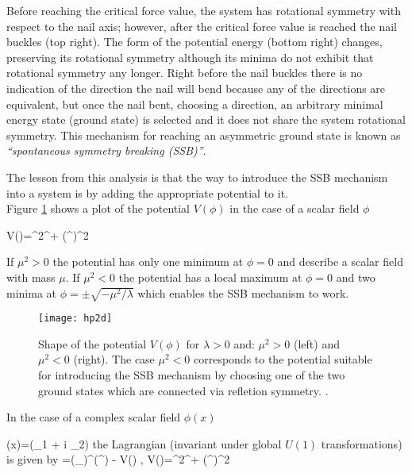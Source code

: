 \noindent Before reaching the critical force value, the system has rotational symmetry with respect to the nail axis; however, after the critical force value is reached the nail buckles (top right). The form of the potential energy (bottom right) changes, preserving its rotational symmetry although its minima do not exhibit that rotational symmetry any longer. Right before the nail buckles there is no indication of the direction the nail will bend because any of the directions are equivalent, but once the nail bent, choosing a direction, an arbitrary minimal energy state (ground state) is selected and it does not share the system rotational symmetry. This mechanism for reaching an asymmetric ground state is known as \textit{``spontaneous symmetry breaking (SSB)''}.       

\noindent The lesson from this analysis is that the way to introduce the SSB mechanism into a system is by adding the appropriate potential to it.\\ 

\noindent Figure \ref{hp2d} shows a plot of the potential $V(\phi)$ in the case of a scalar field $\phi$

\beqn\label{Higgs_potential}
V(\phi)=\mu^2\phi^\dagger\phi + \lambda(\phi^\dagger\phi)^2
\eeqn

\noindent If $\mu^2>0$ the potential has only one minimum at $\phi=0$ and describe a scalar field with mass $\mu$. If $\mu^2<0$ the potential has a local maximum at $\phi=0$ and two minima at $\phi=\pm \sqrt{-\mu^2/\lambda}$ which enables the SSB mechanism to work. 

\begin{figure}[!h]
\centering
\texttt{[image: hp2d]}
\caption[SSB Potential form]{Shape of the potential $V(\phi)$ for $\lambda>0$ and: $\mu^2>0$ (left) and $\mu^2<0$ (right). The case $\mu^2<0$ corresponds to the potential suitable for introducing the SSB mechanism by choosing one of the two ground states which are connected via refletion symmetry. \cite{broken_symmetry}.}
\label{hp2d}
\end{figure}

\noindent In the case of a complex scalar field $\phi(x)$

\beqn\label{complex_scalar}
\phi(x)=(\phi_1 + i \phi_2)
\eeqn
\noindent the Lagrangian (invariant under global $U(1)$ transformations) is given by 
\beqn\label{higgs_potential}
\Lagr=(\partial_\mu\phi)^\dagger(\partial^\mu\phi) - V(\phi) , \qquad V(\phi)=\mu^2\phi^\dagger\phi + \lambda(\phi^\dagger\phi)^2
\eeqn

